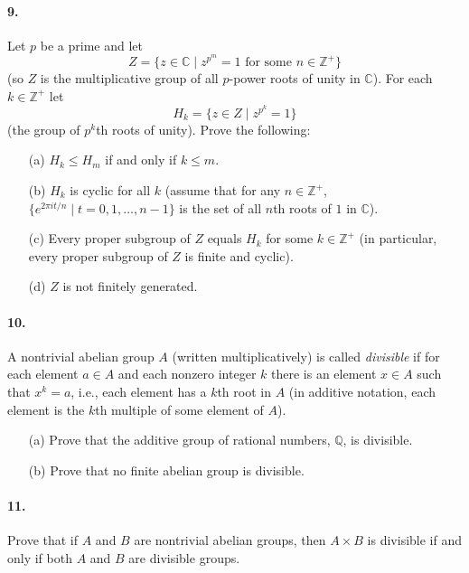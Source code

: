 \paragraph{9.} Let $p$ be a prime and let 
\[
Z = \{ z \in \mathbb{C} \mid z^{p^m} = 1 \text{ for some } n \in \mathbb{Z}^+ \}
\] 
(so $Z$ is the multiplicative group of all $p$-power roots of unity in $\mathbb{C}$). For each $k \in \mathbb{Z}^+$ let 
\[
H_k = \{ z \in Z \mid z^{p^k} = 1 \} 
\] 
(the group of $p^k$th roots of unity). Prove the following:
\begin{enumerate}
    \item[(a)] $H_k \le H_m$ if and only if $k \le m$.
    \item[(b)] $H_k$ is cyclic for all $k$ (assume that for any $n \in \mathbb{Z}^+$, $\{ e^{2 \pi i t / n} \mid t = 0,1,\dots, n-1\}$ is the set of all $n$th roots of $1$ in $\mathbb{C}$).
    \item[(c)] Every proper subgroup of $Z$ equals $H_k$ for some $k \in \mathbb{Z}^+$ (in particular, every proper subgroup of $Z$ is finite and cyclic).
    \item[(d)] $Z$ is not finitely generated.
\end{enumerate}

\paragraph{10.} A nontrivial abelian group $A$ (written multiplicatively) is called \textit{divisible} if for each element $a \in A$ and each nonzero integer $k$ there is an element $x \in A$ such that $x^k = a$, i.e., each element has a $k$th root in $A$ (in additive notation, each element is the $k$th multiple of some element of $A$).
\begin{enumerate}
    \item[(a)] Prove that the additive group of rational numbers, $\mathbb{Q}$, is divisible.
    \item[(b)] Prove that no finite abelian group is divisible.
\end{enumerate}

\paragraph{11.} Prove that if $A$ and $B$ are nontrivial abelian groups, then $A \times B$ is divisible if and only if both $A$ and $B$ are divisible groups.

